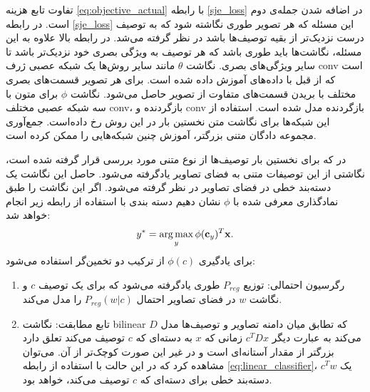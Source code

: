تفاوت تابع هزینه \eqref{eq:objective_actual} با رابطه \eqref{sje_loss} در اضافه شدن جمله‌ی دوم است. در  رابطه \eqref{sje_loss} این مسئله که هر تصویر طوری نگاشته شود که به توصیف درست نزدیک‌تر از بقیه توصیف‌ها باشد در نظر گرفته می‌شد. در رابطه بالا علاوه به این مسئله، نگاشت‌ها باید طوری باشد که هر توصیف به ويژگی بصری خود نزدیک‌تر باشد تا سایر ویژگی‌های بصری.
نگاشت $\theta$ مانند سایر روش‌ها یک شبکه عصبی ژرف \gls{conv} است که از قبل با داده‌های  آموزش داده شده است. برای هر تصویر قسمت‌های بصری مختلف با بریدن قسمت‌های متفاوت از تصویر حاصل می‌شود. نگاشت $\phi$ برای متون با سه شبکه عصبی مختلف \gls{conv}، بازگردنده و \gls{conv} بازگردنده مدل شده است. استفاده از این شبکه‌ها برای نگاشت متن نخستین بار در این روش رخ داده‌است. جمع‌آوری مجموعه دادگان متنی بزرگتر، آموزش چنین شبکه‌هایی را ممکن کرده است.

در  \cite{mohamed13} که برای نخستین بار توصیف‌ها از نوع متنی مورد بررسی قرار گرفته شده است، نگاشتی از این توصیفات متنی به فضای تصاویر یادگرفته می‌شود. حاصل این نگاشت یک دسته‌بند خطی در فضای تصاویر در نظر گرفته می‌شود. اگر این نگاشت را طبق نمادگذاری معرفی شده با $\phi$ نشان دهیم دسته بندی با استفاده از رابطه زیر انجام خواهد شد:
\begin{equation} \label{eq:linear_classifier}
y^* = \operatorname*{arg\,max}_y \phi(\mathbf{c}_y)^T \mathbf{x}.
\end{equation}
برای یادگیری $\phi(c)$ از ترکیب دو تخمین‌گر استفاده می‌شود:
\begin{enumerate}
\item
رگرسیون احتمالی: توزیع $P_{reg}$ طوری یادگرفته می‌شود که برای یک توصیف $c$ و نگاشت $w$ در فضای تصاویر  احتمال $P_{reg}(w|c)$ را مدل می‌کند.
\item
تابع مطابقت: نگاشت \gls{bilinear} $D$ که تطابق میان دامنه تصاویر و توصیف‌ها مدل می‌کند به عبارت دیگر $c^TDx$ زمانی که $x$ به دسته‌ای که   $c$ توصیف می‌کند تعلق دارد بزرگتر از مقدار آستانه‌ای است و در غیر این صورت کوچک‌تر از آن. می‌توان مشاهده کرد که در این حالت با استفاده از رابطه
\eqref{eq:linear_classifier}،
 $c^Tw$
یک  دسته‌بند خطی برای دسته‌ای که $c$ توصیف می‌کند، خواهد بود.
\end{enumerate}

